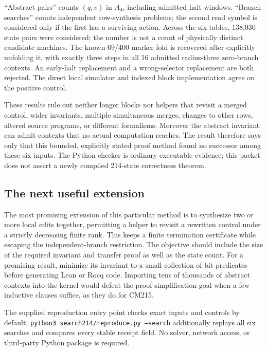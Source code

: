 ``Abstract pairs'' counts $(q,v)$ in $A_4$, including admitted halt
windows.  ``Branch searches'' counts independent row-synthesis problems; the
second read symbol is considered only if the first has a surviving action.
Across the six tables, 138,030 state pairs were considered;
the number is not a count of physically distinct candidate machines.
The known 69/400 marker fold is recovered after explicitly unfolding it,
with exactly three steps in all 16 admitted radius-three zero-branch
contexts.  An early-halt replacement and a wrong-selector replacement are
both rejected.  The direct local simulator and indexed block implementation
agree on the positive control.

These results rule out neither longer blocks nor helpers that revisit a
merged control, wider invariants, multiple simultaneous merges, changes to
other rows, altered source programs, or different formalisms.  Moreover the
abstract invariant can admit contexts that no actual computation reaches.
The result therefore says only that this bounded, explicitly stated proof
method found no successor among these six inputs.  The Python checker is
ordinary executable evidence; this packet does not assert a newly compiled
214-state correctness theorem.

\subsection{The next useful extension}

The most promising extension of this particular method is to synthesize
two or more local edits together, permitting a helper to revisit a rewritten
control under a strictly decreasing finite rank.  This keeps a finite
termination certificate while escaping the independent-branch restriction.
The objective should include the size of the required invariant and transfer
proof as well as the state count.  For a promising result, minimize its
invariant to a small collection of bit predicates before generating Lean
or Rocq code.  Importing tens of thousands of abstract contexts into the
kernel would defeat the proof-simplification goal when a few inductive
clauses suffice, as they do for CM215.

The supplied reproduction entry point checks exact inputs and controls by
default; \texttt{python3 search214/reproduce.py --search} additionally replays all six
searches and compares every stable receipt field.  No solver, network
access, or third-party Python package is required.
